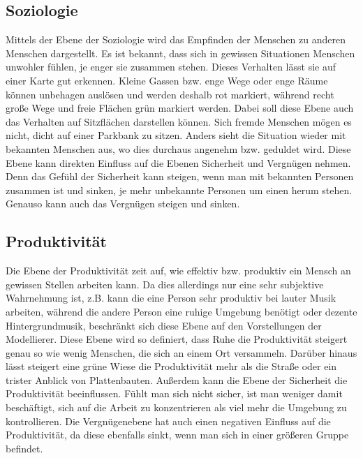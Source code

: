 \documentclass[10pt]{scrartcl}
\begin{document}
\subsection{Soziologie}
Mittels der Ebene der Soziologie wird das Empfinden der Menschen zu anderen Menschen dargestellt. Es ist bekannt, dass sich in gewissen Situationen Menschen unwohler fühlen, je enger sie zusammen stehen. Dieses Verhalten lässt sie auf einer Karte gut erkennen. Kleine Gassen bzw. enge Wege oder enge Räume können unbehagen auslösen und werden deshalb rot markiert, während recht große Wege und freie Flächen grün markiert werden.
\newline Dabei soll diese Ebene auch das Verhalten auf Sitzflächen darstellen können. Sich fremde Menschen mögen es nicht, dicht auf einer Parkbank zu sitzen. Anders sieht die Situation wieder mit bekannten Menschen aus, wo dies durchaus angenehm bzw. geduldet wird.
\newline Diese Ebene kann direkten Einfluss auf die Ebenen Sicherheit und Vergnügen nehmen. Denn das Gefühl der Sicherheit kann steigen, wenn man mit bekannten Personen zusammen ist und sinken, je mehr unbekannte Personen um einen herum stehen. Genauso kann auch das Vergnügen steigen und sinken.

\subsection{Produktivität}
Die Ebene der Produktivität zeit auf, wie effektiv bzw. produktiv ein Mensch an gewissen Stellen arbeiten kann. Da dies allerdings nur eine sehr subjektive Wahrnehmung ist, z.B. kann die eine Person sehr produktiv bei lauter Musik arbeiten, während die andere Person eine ruhige Umgebung benötigt oder dezente Hintergrundmusik, beschränkt sich diese Ebene auf den Vorstellungen der Modellierer.
\newline Diese Ebene wird so definiert, dass Ruhe die Produktivität steigert genau so wie wenig Menschen, die sich an einem Ort versammeln. Darüber hinaus lässt steigert eine grüne Wiese die Produktivität mehr als die Straße oder ein trister Anblick von Plattenbauten.
\newline Außerdem kann die Ebene der Sicherheit die Produktivität beeinflussen. Fühlt man sich nicht sicher, ist man weniger damit beschäftigt, sich auf die Arbeit zu konzentrieren als viel mehr die Umgebung zu kontrollieren. Die Vergnügenebene hat auch einen negativen Einfluss auf die Produktivität, da diese ebenfalls sinkt, wenn man sich in einer größeren Gruppe befindet.
\end{document}
